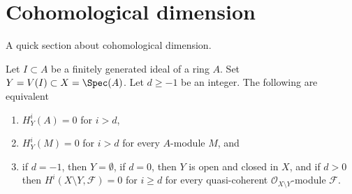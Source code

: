 \section{Cohomological dimension}
\label{section-cd}

\noindent
A quick section about cohomological dimension.

\begin{lemma}
\label{lemma-cd}
Let $I \subset A$ be a finitely generated ideal of a ring $A$.
Set $Y = V(I) \subset X = \Spec(A)$. Let $d \geq -1$ be an integer.
The following are equivalent
\begin{enumerate}
\item $H^i_Y(A) = 0$ for $i > d$,
\item $H^i_Y(M) = 0$ for $i > d$ for every $A$-module $M$, and
\item if $d = -1$, then $Y = \emptyset$, if $d = 0$, then
$Y$ is open and closed in $X$, and if $d > 0$ then
$H^i(X \setminus Y, \mathcal{F}) = 0$ for $i \geq d$
for every quasi-coherent $\mathcal{O}_{X \setminus Y}$-module $\mathcal{F}$.
\end{enumerate}
\end{lemma}

